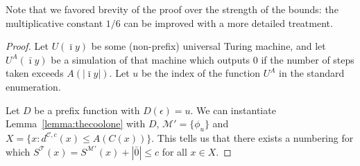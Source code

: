 \documentclass{style/llncs}
\newcommand{\M}{\mathscr M}
\newcommand{\C}{\mathscr C}
\newcommand{\T}{\mathscr T}
\newcommand{\s}{S}
\begin{document}
Note that we favored brevity of the proof over the strength of the bounds: the multiplicative constant $1/6$ can be improved with a more detailed treatment.

\depth*
\begin{proof}
Let $U(\bar\imath y)$ be some (non-prefix) universal Turing machine, and let $U^A(\bar\imath y)$ be a simulation of that machine which outputs $0$ if the number of steps taken exceeds $A(|\bar\imath y|)$. Let $u$ be the index of the function $U^A$ in the standard enumeration.

Let $D$ be a prefix function with $D(\epsilon) = u$. We can instantiate Lemma~\ref{lemma:thecoolone} with $D$, $\M' = \{\phi_u\}$ and $X = \{x : d^{\C,c}(x) \leq A(C(x))\}$. This tells us that there exists a numbering for which $\s^\T(x) = \s^{\M'}(x) + |\bar0| \leq c$ for all $x \in X$.
\end{proof}
\end{document}
